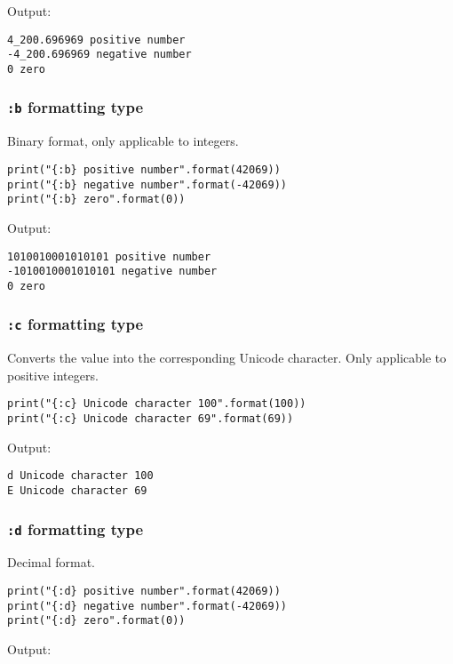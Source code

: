 \documentclass[11pt]{article}
\begin{document}
 \noindent Output:

\begin{verbatim}
4_200.696969 positive number
-4_200.696969 negative number
0 zero
\end{verbatim}

\subsubsection{\texttt{:b} formatting type}
\label{sec:orgaf8c6cf}
Binary format, only applicable to integers.

\begin{verbatim}
print("{:b} positive number".format(42069))
print("{:b} negative number".format(-42069))
print("{:b} zero".format(0))
\end{verbatim}

 \noindent Output:

\begin{verbatim}
1010010001010101 positive number
-1010010001010101 negative number
0 zero
\end{verbatim}

\subsubsection{\texttt{:c} formatting type}
\label{sec:orgbefe305}
Converts the value into the corresponding Unicode character. Only applicable to positive integers.

\begin{verbatim}
print("{:c} Unicode character 100".format(100))
print("{:c} Unicode character 69".format(69))
\end{verbatim}

 \noindent Output:

\begin{verbatim}
d Unicode character 100
E Unicode character 69
\end{verbatim}

\subsubsection{\texttt{:d} formatting type}
\label{sec:org8d7acb8}
Decimal format.

\begin{verbatim}
print("{:d} positive number".format(42069))
print("{:d} negative number".format(-42069))
print("{:d} zero".format(0))
\end{verbatim}

 \noindent Output:
\end{document}
